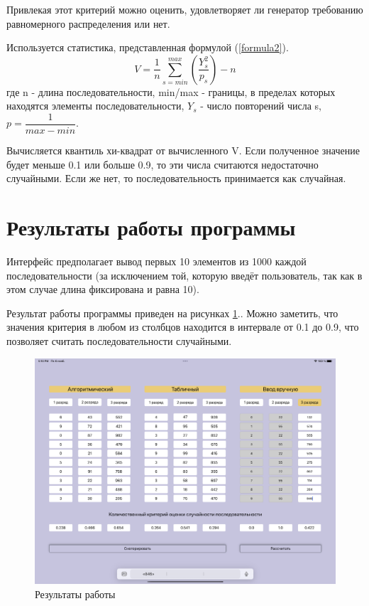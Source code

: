 \documentclass[14pt, a4paper]{extarticle}
\begin{document}
Привлекая этот критерий можно оценить, удовлетворяет ли генератор требованию равномерного распределения или нет.

Используется статистика, представленная формулой (\ref{formula2}).
\begin{equation}\label{formula2}
	V = \frac{1}{n}\sum_{s=min}^{max} \left( \frac{Y_s^2}{p_s} \right) - n
\end{equation}
где n - длина последовательности, min/max - границы, в пределах которых находятся элементы последовательности, $Y_s$ - число повторений числа s, $p = \dfrac{1}{max - min}$.

Вычисляется квантиль хи-квадрат от вычисленного V. Если полученное значение будет меньше 0.1 или больше 0.9, то эти числа считаются недостаточно случайными. Если же нет, то последовательность принимается как случайная. 

\section{Результаты работы программы}

Интерфейс предполагает вывод первых 10 элементов из 1000 каждой последовательности (за исключением той, которую введёт пользователь, так как в этом случае длина фиксирована и равна 10). 

Результат работы программы приведен на рисунках \ref{pic:2}.. Можно заметить, что значения критерия в любом из столбцов находится в интервале от 0.1 до 0.9, что позволяет считать последовательности случайными.

\begin{figure}[ht!]
	\begin{center}
		{\includegraphics[scale=0.15]{pictures/res.png}
			\caption{Результаты работы}
			\label{pic:2}}
	\end{center}
\end{figure}
\end{document}
